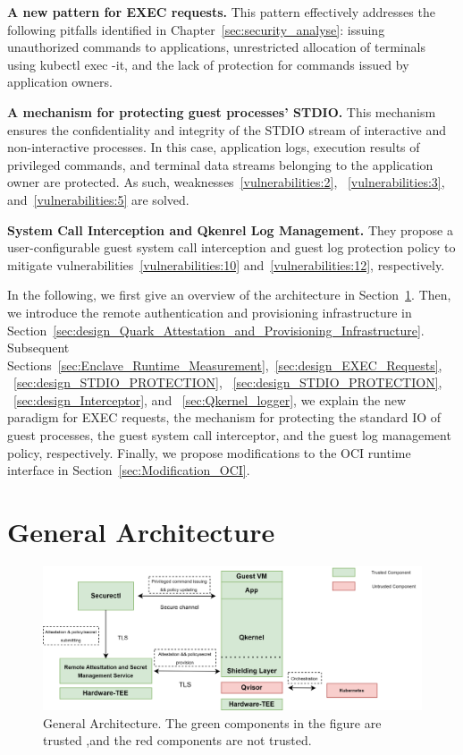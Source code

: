\textbf{A new pattern for EXEC requests.} This pattern effectively addresses the following pitfalls identified in Chapter~\ref{sec:security_analyse}: issuing unauthorized commands to applications, unrestricted allocation of terminals using kubectl exec -it, and the lack of protection for commands issued by application owners.

\textbf{A mechanism for protecting guest processes' STDIO.} This mechanism ensures the confidentiality and integrity of the STDIO stream of interactive and non-interactive processes. In this case, application logs, execution results of privileged commands, and terminal data streams belonging to the application owner are protected. As such, weaknesses~\ref{vulnerabilities:2}, ~\ref{vulnerabilities:3}, and~\ref{vulnerabilities:5} are solved.

\textbf{System Call Interception and Qkenrel Log Management.} They propose a user-configurable guest system call interception and guest log protection policy to mitigate vulnerabilities~\ref{vulnerabilities:10} and~\ref{vulnerabilities:12}, respectively.
 
In the following, we first give an overview of the architecture in Section~\ref{sec:General_Architecture}. Then, we introduce the remote authentication and provisioning infrastructure in Section~\ref{sec:design_Quark_Attestation_and_Provisioning_Infrastructure}. Subsequent Sections~\ref{sec:Enclave_Runtime_Measurement},~\ref{sec:design_EXEC_Requests},
~\ref{sec:design_STDIO_PROTECTION}, ~\ref{sec:design_STDIO_PROTECTION}, ~\ref{sec:design_Interceptor}, and ~\ref{sec:Qkernel_logger}, we explain the new paradigm for EXEC requests, the 
mechanism for protecting the standard IO of guest processes, the guest system call interceptor, and the guest log management policy, respectively. Finally, we propose modifications to the OCI runtime interface in Section~\ref{sec:Modification_OCI}.


\section{General Architecture}
\label{sec:General_Architecture}
\begin{figure}[htp]
    \centering
    \includegraphics[height=0.3\textheight, width=1\textwidth]{images/genaral_architechture.png}
    \caption[General Architecture]{General Architecture. The green components in the figure are trusted ,and the red components are not trusted.}
    \label{fig:genaral_architechture}
\end{figure}

